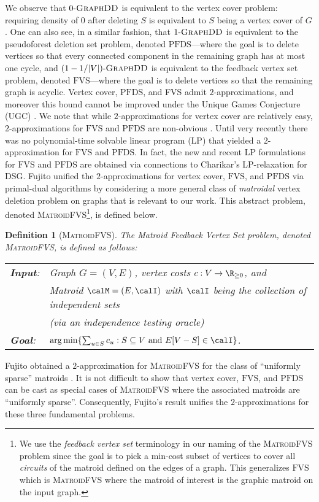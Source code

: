 \documentclass{article}
\newtheorem{definition}{Definition}[section]
\newcommand{\dsg}{\textsc{DSG}\xspace}
\newcommand{\mfvs}{\textsc{MatroidFVS}\xspace}
\newcommand{\dds}{\ensuremath{\textsc{GraphDD}}\xspace}
\newcommand{\rhodds}[1]{\ensuremath{#1\text{-}\dds}\xspace}
\newcommand{\pfds}{\ensuremath{\text{PFDS}}\xspace}
\newcommand{\FVS}{\textsc{FVS}\xspace}
\newcommand{\fvs}{\ensuremath{\text{FVS}}\xspace}
\begin{document}
We observe that \rhodds{0} is equivalent to the vertex cover problem: requiring density of $0$ after deleting $S$ is equivalent to $S$ being a vertex cover of $G$.  One can also see, in a similar fashion, that \rhodds{1} is equivalent to the pseudoforest deletion set problem, denoted \pfds---where the goal is to delete vertices so that every connected component in the remaining graph has at most one cycle, and \rhodds{(1 - 1/|V|)} is equivalent to the feedback vertex set problem, denoted \fvs---where the goal is to delete vertices so that the remaining graph is acyclic. Vertex cover, \pfds, and \FVS admit $2$-approximations, and moreover this bound cannot be improved under the Unique Games Conjecture (UGC) \cite{KhotR08}. We note that while $2$-approximations for vertex cover are relatively easy, $2$-approximations for \fvs and \pfds are non-obvious \cite{Bafna-Berman-Fujito95,BG96,CHUDAK1998111}. 
Until very recently there was no polynomial-time solvable linear program (LP) that yielded a $2$-approximation for \fvs and \pfds.  
In fact, the new and recent LP formulations \cite{chandrasekaran2024polyhedralaspectsfeedbackvertex} for \fvs and \pfds are obtained via  connections to Charikar's LP-relaxation for \dsg \cite{charikar_greedy_2000}.  Fujito \cite{Fujito-matroid-fvs} unified the $2$-approximations for vertex cover, \fvs, and \pfds via primal-dual algorithms by considering a more general class of \emph{matroidal} vertex deletion problem on graphs that is relevant to our work. This abstract problem, denoted \mfvs\footnote{We use the 
\emph{feedback vertex set} terminology in our naming of the \mfvs problem since the goal is to pick a min-cost subset of vertices to cover all \emph{circuits} of the matroid defined on the edges of a graph. This generalizes \fvs which is \mfvs where the matroid of interest is the graphic matroid on the input graph.}, 
is defined below. 
\begin{definition}[\mfvs] The Matroid Feedback Vertex Set problem, denoted \mfvs, is defined as follows:
    \begin{mdframed}
\begin{tabular}{ l l }
 \emph{\textbf{Input}:} &  Graph $G=(V, E)$, vertex costs $c:V\rightarrow\R_{\ge 0}$, and  \\ 
 & Matroid $\calM = (E, \calI)$ with $\calI$ being the collection of independent sets \\
 & \quad \quad (via an independence testing oracle)
 \vspace{1mm}\\  
\emph{\textbf{Goal}:} & $\arg \min\{\sum_{u\in S}c_u : S\subseteq V \text{ and } E[V-S] \in \calI\}$. 
\end{tabular}
\end{mdframed}
\end{definition}
Fujito \cite{Fujito-matroid-fvs} obtained a $2$-approximation for \mfvs for the class of ``uniformly sparse'' matroids \cite{Lee_Streinu_2008}. 
It is not difficult to show that vertex cover, \fvs, and \pfds can  be cast as special cases of \mfvs 
where the associated matroids are ``uniformly sparse''.  Consequently, Fujito's result unifies the $2$-approximations for these three fundamental problems. 
\end{document}
